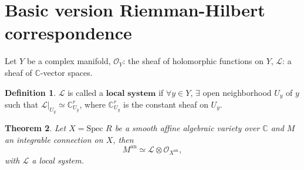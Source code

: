 \documentclass[openany]{book}
\newtheorem{theorem}{Theorem}[chapter] %
\theoremstyle{definition} %
\newtheorem{definition}[theorem]{Definition} %
\theoremstyle{remark}
\begin{document}
\section{Basic version Riemman-Hilbert correspondence}

Let $Y$ be a complex manifold, $\mathcal{O}_Y$: the sheaf of holomorphic functions on $Y$, $\mathcal{L}$: a sheaf of $\mathbb{C}$-vector spaces.

\begin{definition}
    $\mathcal{L}$ is called a $\textbf{local system}$ if $\forall y \in Y$, $\exists$ open neighborhood $U_y$ of $y$ such that $\mathcal{L}|_{U_y} \simeq\mathbb{C}^r_{U_y}$, where $\mathbb{C}^{r}_{U_y}$ is the constant sheaf on $U_y$.
\end{definition}

\begin{theorem}
    Let $X = \text{Spec } R$ be a smooth affine algebraic variety over $\mathbb{C}$ and $M$ an integrable connection on $X$, then $$M^{\text{an}} \simeq \mathcal{L} \otimes \mathcal{O}_{X^{\text{an}}},$$with $\mathcal{L}$ a local system.
\end{theorem}
\end{document}
